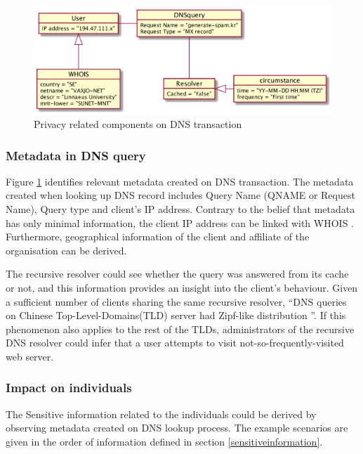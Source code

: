 \begin{figure}[ht!]
    \begin{center}
        \includegraphics*[width=\columnwidth]{img/privacyobject}
    \end{center}
    \caption{Privacy related components on DNS transaction}
    \label{privacyobject}
\end{figure}

\subsubsection{Metadata in DNS query}\label{dnsmetadata}
Figure \ref{privacyobject} identifies relevant metadata created on DNS transaction.
The metadata created when looking up DNS record includes Query Name (QNAME or Request Name), Query type and client's IP address.
Contrary to the belief that metadata has only minimal information, the client IP address can be linked with WHOIS \cite{whois-icann}. Furthermore, geographical information of the client and affiliate of the organisation can be derived.

The recursive resolver could see whether the query was answered from its cache or not, and this information provides an insight into the client's behaviour.
Given a sufficient number of clients sharing the same recursive resolver, ``DNS queries on Chinese Top-Level-Domains(TLD) server had Zipf-like distribution \cite{wang2013analysis}''. If this phenomenon also applies to the rest of the TLDs, administrators of the recursive DNS resolver could infer that a user attempts to visit not-so-frequently-visited web server.

\subsubsection{Impact on individuals}
The Sensitive information related to the individuals could be derived by observing metadata created on DNS lookup process. The example scenarios are given in the order of information defined in section \ref{sensitiveinformation}.

